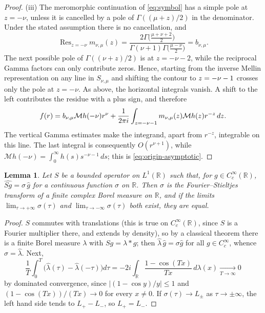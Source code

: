 \documentclass[11pt,a4paper,reqno,backref=page]{amsart}
\newcommand{\R}{\mathbb R}
\newcommand{\Mell}{\mathcal M}               %
\newcommand{\dd}{\,d}
\DeclareMathOperator{\Res}{Res}
\let\Re\relax\DeclareMathOperator{\Re}{Re}
\numberwithin{equation}{section}
\newtheorem{lemma}[theorem]{Lemma}
\theoremstyle{definition}
\theoremstyle{remark}
\begin{document}
\begin{proof}
(iii) The meromorphic continuation of \eqref{eq:symbol} has a
simple pole at $z=-\nu$, unless it is cancelled by a pole of
$\Gamma((\mu+z)/2)$ in the denominator. Under the stated
assumption there is no cancellation, and
\begin{equation*}
  \Res_{z=-\nu}m_{\nu,\mu}(z)
  =\frac{2\Gamma\bigl(\frac{\mu+\nu+2}{2}\bigr)}
  {\Gamma(\nu+1)\Gamma\bigl(\frac{\mu-\nu}{2}\bigr)}
  =b_{\nu,\mu}.
\end{equation*}
The next possible pole of $\Gamma((\nu+z)/2)$ is at $z=-\nu-2$,
while the reciprocal Gamma factors can only contribute zeros.
Hence, starting from the inverse Mellin representation on any
line in $S_{\nu,\mu}$ and shifting the contour to $\Re z=-\nu-1$
crosses only the pole at $z=-\nu$. As above, the horizontal
integrals vanish. A shift to the left contributes the residue
with a plus sign, and therefore
\begin{equation*}
  f(r)=b_{\nu,\mu}\Mell h(-\nu)r^\nu
  +\frac1{2\pi i}\int_{\Re z=-\nu-1}m_{\nu,\mu}(z)\Mell
  h(z)r^{-z}\dd z.
\end{equation*}
The vertical Gamma estimates make the integrand, apart from
$r^{-z}$, integrable on this line. The last integral is
consequently $O(r^{\nu+1})$, while $\Mell h(-\nu)=\int_0^\infty
h(s)s^{-\nu-1}\dd s$; this is \eqref{eq:origin-asymptotic}.
\end{proof}

\begin{lemma}\label{lem:L1-mult}
Let $S$ be a bounded operator on $L^1(\R)$ such that, for $g\in
C_c^\infty(\R)$, $\widehat{Sg}=\sigma\,\widehat g$ for a
continuous function $\sigma$ on $\R$. Then $\sigma$ is the
Fourier--Stieltjes transform of a finite complex Borel measure
on $\R$, and if the limits $\lim_{\tau\to+\infty}\sigma(\tau)$
and $\lim_{\tau\to-\infty}\sigma(\tau)$ both exist, they are
equal.
\end{lemma}

\begin{proof}
$S$ commutes with translations (this is true on
$C_c^\infty(\R)$, since $S$ is a Fourier multiplier there, and
extends by density), so by a classical theorem
\cite[Ch.~I, Thm.~3.19]{SteinWeiss1971} there is a finite
Borel measure
$\lambda$ with $Sg=\lambda*g$; then $\widehat\lambda\,\widehat g
=\sigma\widehat g$ for all $g\in C_c^\infty$, whence
$\sigma=\widehat\lambda$. Next,
\begin{equation*}
  \frac1T\int_0^T\bigl(\widehat\lambda(\tau)
    -\widehat\lambda(-\tau)\bigr)d\tau
  =-2i\int_\R\frac{1-\cos(Tx)}{Tx}\,d\lambda(x)
    \xrightarrow[T\to\infty]{}0
\end{equation*}
by dominated convergence, since $|(1-\cos y)/y|\le1$ and
$(1-\cos(Tx))/(Tx)\to0$ for every $x\neq0$. If $\sigma(\tau)\to
L_\pm$ as $\tau\to\pm\infty$, the left hand side tends to
$L_+-L_-$, so $L_+=L_-$.
\end{proof}
\end{document}
